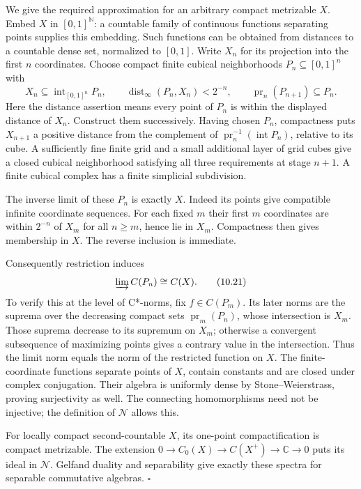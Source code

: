 \documentclass[
  11pt,
]{article}
\begin{document}
We give the required approximation for an arbitrary compact metrizable
\(X\). Embed \(X\) in \([0,1]^{\mathbb N}\): a countable family of
continuous functions separating points supplies this embedding. Such
functions can be obtained from distances to a countable dense set,
normalized to \([0,1]\). Write \(X_n\) for its projection into the first
\(n\) coordinates. Choose compact finite cubical neighborhoods
\(P_n\subseteq[0,1]^n\) with \[
X_n\subseteq\operatorname{int}_{[0,1]^n}P_n,\qquad
\operatorname{dist}_{\infty}(P_n,X_n)<2^{-n},\qquad
\operatorname{pr}_{n}(P_{n+1})\subseteq P_n.
\tag{10.20}
\] Here the distance assertion means every point of \(P_n\) is within
the displayed distance of \(X_n\). Construct them successively. Having
chosen \(P_n\), compactness puts \(X_{n+1}\) a positive distance from
the complement of \(\operatorname{pr}_n^{-1}(\operatorname{int}P_n)\),
relative to its cube. A sufficiently fine finite grid and a small
additional layer of grid cubes give a closed cubical neighborhood
satisfying all three requirements at stage \(n+1\). A finite cubical
complex has a finite simplicial subdivision.

The inverse limit of these \(P_n\) is exactly \(X\). Indeed its points
give compatible infinite coordinate sequences. For each fixed \(m\)
their first \(m\) coordinates are within \(2^{-n}\) of \(X_m\) for all
\(n\ge m\), hence lie in \(X_m\). Compactness then gives membership in
\(X\). The reverse inclusion is immediate.

Consequently restriction induces \[
\varinjlim C(P_n)\cong C(X).
\tag{10.21}
\] To verify this at the level of C*-norms, fix \(f\in C(P_m)\). Its
later norms are the suprema over the decreasing compact sets
\(\operatorname{pr}_m(P_n)\), whose intersection is \(X_m\). Those
suprema decrease to its supremum on \(X_m\); otherwise a convergent
subsequence of maximizing points gives a contrary value in the
intersection. Thus the limit norm equals the norm of the restricted
function on \(X\). The finite-coordinate functions separate points of
\(X\), contain constants and are closed under complex conjugation. Their
algebra is uniformly dense by Stone--Weierstrass, proving surjectivity
as well. The connecting homomorphisms need not be injective; the
definition of \(\mathcal N\) allows this.

For locally compact second-countable \(X\), its one-point
compactification is compact metrizable. The extension
\(0\to C_0(X)\to C(X^+)\to\mathbb C\to0\) puts its ideal in
\(\mathcal N\). Gelfand duality and separability give exactly these
spectra for separable commutative algebras. \(\square\)
\end{document}
